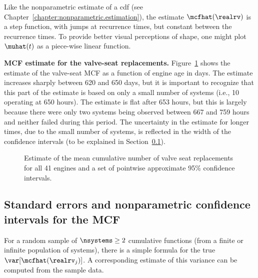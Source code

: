 Like the nonparametric estimate of a cdf (see
Chapter~\ref{chapter:nonparametric.estimation}), the estimate
$\mcfhat(\realrv)$ is a step function, with jumps at recurrence times, but
constant between the recurrence
times. To provide better visual perceptions of shape, one might plot
$\muhat(t)$ as a piece-wise linear function.

\begin{example}
\label{example:valve.data}
{\bf MCF estimate for the valve-seat replacements.}
Figure~\ref{figure:valveseat.mcf.plot.ps} shows the estimate of the
valve-seat MCF as a function of engine age in days. The estimate
increases sharply between 620 and 650 days, but it is important to
recognize that this part of the estimate is based on only a small
number of systems (i.e., 10 operating at 650 hours).  The estimate is
flat after 653 hours, but this is largely because there were only two
systems being observed between 667 and 759 hours and neither failed
during this period.  The uncertainty in the estimate for longer
times, due to the small number of systems, is reflected in the width
of the confidence intervals (to be explained in
Section~\ref{section:conf.int.for.mcf}).
\begin{figure}
\caption{Estimate of the mean cumulative number of valve seat replacements
for all 41 engines and a set of pointwise approximate 95\% confidence
intervals.}
\label{figure:valveseat.mcf.plot.ps}
\end{figure}
\end{example}

\subsection{Standard errors and nonparametric 
confidence intervals for the MCF}
\label{section:conf.int.for.mcf}
For a random sample of $\nsystems \ge 2 $ cumulative functions (from a
finite or infinite population of systems), there is a simple formula
for the true $\var[\mcfhat(\realrv_{j})]$. A
corresponding estimate of this variance can be computed from the
sample data.

